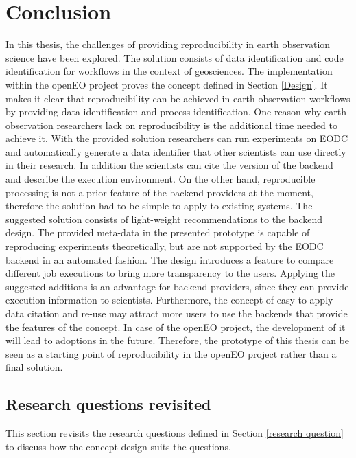 \documentclass[draft,final]{vutinfth} %
\begin{document}
\section{Conclusion}
In this thesis, the challenges of providing reproducibility in earth observation science have been explored. The solution consists of data identification and code identification for workflows in the context of geosciences. The implementation within the openEO project proves the concept defined in Section \ref{Design}. It makes it clear that reproducibility can be achieved in earth observation workflows by providing data identification and process identification. One reason why earth observation researchers lack on reproducibility is the additional time needed to achieve it. With the provided solution researchers can run experiments on EODC and automatically generate a data identifier that other scientists can use directly in their research. In addition the scientists can cite the version of the backend and describe the execution environment. On the other hand, reproducible processing is not a prior feature of the backend providers at the moment, therefore the solution had to be simple to apply to existing systems. The suggested solution consists of light-weight recommendations to the backend design. The provided meta-data in the presented prototype is capable of reproducing experiments theoretically, but are not supported by the EODC backend in an automated fashion. The design introduces a feature to compare different job executions to bring more transparency to the users. Applying the suggested additions is an advantage for backend providers, since they can provide execution information to scientists. Furthermore, the concept of easy to apply data citation and re-use may attract more users to use the backends that provide the features of the concept. In case of the openEO project, the development of it will lead to adoptions in the future. Therefore, the prototype of this thesis can be seen as a starting point of reproducibility in the openEO project rather than a final solution.  

\subsection{Research questions revisited}\label{research question revisited}

This section revisits the research questions defined in Section \ref{research question} to discuss how the concept design suits the questions.
\end{document}
